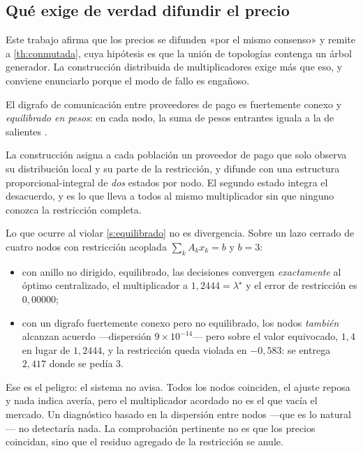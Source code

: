 \subsection{Qué exige de verdad difundir el precio}

Este trabajo afirma que los precios se difunden «por el mismo consenso» y remite a
\cref{th:conmutada}, cuya hipótesis es que la unión de topologías contenga un
árbol generador. La construcción distribuida de multiplicadores exige más que
eso, y conviene enunciarlo porque el modo de fallo es engañoso.

\begin{supuesto}
\label{s:equilibrado}
El digrafo de comunicación entre proveedores de pago es fuertemente conexo y
\emph{equilibrado en pesos}: en cada nodo, la suma de pesos entrantes iguala a la
de salientes \cite{martinezPiazuelo2025gne}.
\end{supuesto}

\begin{observacion}
\label{obs:equilibrado}
La construcción asigna a cada población un proveedor de pago que solo observa su
distribución local y su parte de la restricción, y difunde con una estructura
proporcional-integral de \emph{dos} estados por nodo. El segundo estado integra
el desacuerdo, y es lo que lleva a todos al mismo multiplicador sin que ninguno
conozca la restricción completa.

Lo que ocurre al violar \cref{s:equilibrado} no es divergencia. Sobre un lazo
cerrado de cuatro nodos con restricción acoplada $\sum_k A_kx_k=b$ y $b=3$:
\begin{itemize}[leftmargin=1.9em,topsep=0.2em,itemsep=0.15em]
  \item con anillo no dirigido, equilibrado, las decisiones convergen
  \emph{exactamente} al óptimo centralizado, el multiplicador a $1{,}2444=\lambda^\star$
  y el error de restricción es $0{,}00000$;
  \item con un digrafo fuertemente conexo pero no equilibrado, los nodos
  \emph{también} alcanzan acuerdo —dispersión $9\times10^{-14}$— pero sobre el
  valor equivocado, $1{,}4$ en lugar de $1{,}2444$, y la restricción queda
  violada en $-0{,}583$: se entrega $2{,}417$ donde se pedía $3$.
\end{itemize}

Ese es el peligro: el sistema no avisa. Todos los nodos coinciden, el ajuste
reposa y nada indica avería, pero el multiplicador acordado no es el que vacía el
mercado. Un diagnóstico basado en la dispersión entre nodos —que es lo natural—
no detectaría nada. La comprobación pertinente no es que los precios coincidan,
sino que el residuo agregado de la restricción se anule.
\end{observacion}

